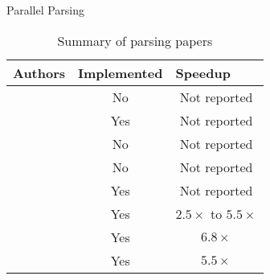 \begin{section}{Parallel Parsing}
\begin{table}[]
\begin{tabular}{|l|c|c|}
\hline
Authors  & \multicolumn{1}{l|}{Implemented} & \multicolumn{1}{l|}{Speedup} \\ \hline
\cite{Lincoln:1970:PPT:987475.987478}    & No                               & Not reported                 \\ \hline
\cite{Krohn:1975:PAC:390015.808414}      & Yes                              & Not reported                 \\ \hline
\cite{fischer1975parsing}                & No                               & Not reported                 \\ \hline
\cite{Mickunas:1978:PCM:800127.804105}   & No                               & Not reported                 \\ \hline
\cite{Pennello:1978:FMA:512760.512786}   & Yes                              & Not reported                 \\ \hline
\cite{fowler2009parallel}                & Yes                              & $2.5\times$ to $5.5\times$   \\ \hline
\cite{dubroy2017incremental}             & Yes                              & $6.8\times$                  \\ \hline
\cite{Barenghi:2015:PPM:2839536.2840146} & Yes                              & $5.5\times$                  \\ \hline
\end{tabular}
\caption{Summary of parsing papers}
\label{table:parser_summary}
\end{table}

\end{section}


